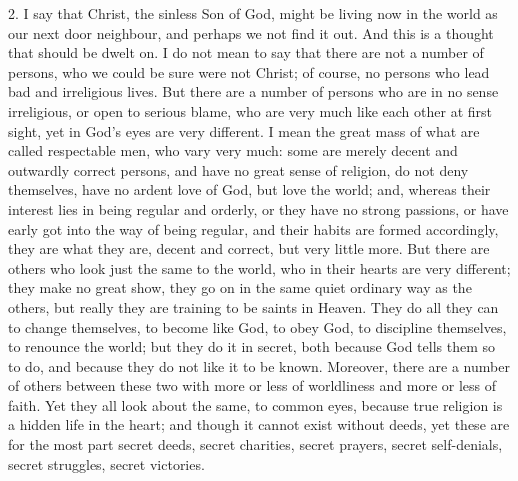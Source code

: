 2. I say that Christ, the sinless Son of God, might be living now
in the world as our next door neighbour, and perhaps we not find it
out. And this is a thought that should be dwelt on. I do not mean to
say that there are not a number of persons, who we could be sure were
not Christ; of course, no persons who lead bad and irreligious lives.
But there are a number of persons who are in no sense irreligious, or
open to serious blame, who are very much like each other at first
sight, yet in God's eyes are very different. I mean the great mass
of what are called respectable men, who vary very much: some are
merely decent and outwardly correct persons, and have no great sense
of religion, do not deny themselves, have no ardent love of God, but
love the world; and, whereas their interest lies in being regular and
orderly, or they have no strong passions, or have early got into the
way of being regular, and their habits are formed accordingly, they
are what they are, decent and correct, but very little more. But there
are others who look just the same to the world, who in their hearts
are very different; they make no great show, they go on in the same
quiet ordinary way as the others, but really they are training to be
saints in Heaven. They do all they can to change themselves, to become
like God, to obey God, to discipline themselves, to renounce the
world; but they do it in secret, both because God tells them so to do,
and because they do not like it to be known. Moreover, there are a
number of others between these two with more or less of worldliness
and more or less of faith. Yet they all look about the same, to common
eyes, because true religion is a hidden life in the heart; and though
it cannot exist without deeds, yet these are for the most part secret
deeds, secret charities, secret prayers, secret self-denials, secret
struggles, secret victories.

